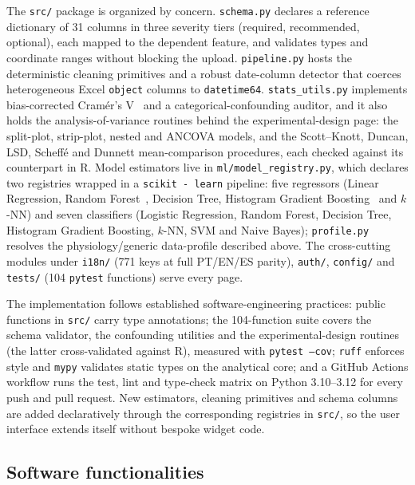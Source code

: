 \documentclass[preprint,12pt,a4paper]{elsarticle}
\begin{document}
The \texttt{src/} package is organized by concern. \texttt{schema.py} declares a reference dictionary of 31 columns in three severity tiers (required, recommended, optional), each mapped to the dependent feature, and validates types and coordinate ranges without blocking the upload. \texttt{pipeline.py} hosts the deterministic cleaning primitives and a robust date-column detector that coerces heterogeneous Excel \texttt{object} columns to \texttt{datetime64}. \texttt{stats\_utils.py} implements bias-corrected Cram\'er's V~\cite{Bergsma2013} and a categorical-confounding auditor, and it also holds the analysis-of-variance routines behind the experimental-design page: the split-plot, strip-plot, nested and ANCOVA models, and the Scott--Knott, Duncan, LSD, Scheff\'e and Dunnett mean-comparison procedures, each checked against its counterpart in R. Model estimators live in \texttt{ml/model\_registry.py}, which declares two registries wrapped in a \texttt{scikit - learn} pipeline: five regressors (Linear Regression, Random Forest~\cite{Breiman2001}, Decision Tree, Histogram Gradient Boosting~\cite{Friedman2001} and $k$-NN) and seven classifiers (Logistic Regression, Random Forest, Decision Tree, Histogram Gradient Boosting, $k$-NN, SVM and Naive Bayes); \texttt{profile.py} resolves the physiology/generic data-profile described above. The cross-cutting modules under \texttt{i18n/} (771 keys at full PT/EN/ES parity), \texttt{auth/}, \texttt{config/} and \texttt{tests/} (104 \texttt{pytest} functions) serve every page.

The implementation follows established software-engineering practices: public functions in \texttt{src/} carry type annotations; the 104-function suite covers the schema validator, the confounding utilities and the experimental-design routines (the latter cross-validated against R), measured with \texttt{pytest --cov}; \texttt{ruff} enforces style and \texttt{mypy} validates static types on the analytical core; and a GitHub Actions workflow runs the test, lint and type-check matrix on Python 3.10--3.12 for every push and pull request. New estimators, cleaning primitives and schema columns are added declaratively through the corresponding registries in \texttt{src/}, so the user interface extends itself without bespoke widget code.

\subsection{Software functionalities}\label{sec:functions}
\end{document}
